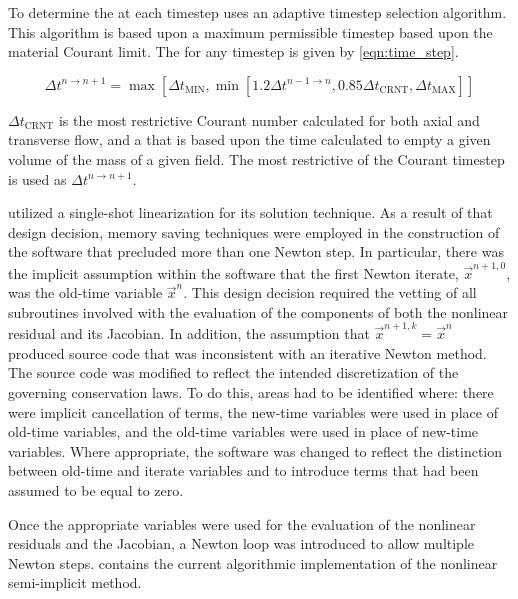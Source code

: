 To determine the \dt{} at each timestep \cobra{} uses an adaptive timestep selection algorithm.
This algorithm is based upon a maximum permissible timestep based upon the material Courant limit.
The \dt{} for any timestep is given by \eqref{eqn:time_step}.

\begin{equation}
\label{eqn:time_step}
\Delta t^{n \rightarrow n+1} = \max\left[ \Delta t_{\text{MIN}}, \min\left[1.2 \Delta t^{n-1 \rightarrow n}, 0.85 \Delta t_{\text{CRNT}}, \Delta t_{\text{MAX}} \right]\right]
\end{equation}

$\Delta t_{\text{CRNT}}$ is the most restrictive Courant number calculated for both axial and transverse flow, and a \dt{} that is based upon the time calculated to empty a given volume of the mass of a given field.
The most restrictive of the Courant timestep is used as $\Delta t^{n \rightarrow n+1}$.

\cobra{} utilized a single-shot linearization for its solution technique.
As a result of that design decision, memory saving techniques were employed in the construction of the software that precluded more than one Newton step.
In particular, there was the implicit assumption within the software that the first Newton iterate, $\vec{x}^{n+1, 0}$, was the old-time variable $\vec{x}^{n}$.
This design decision required the vetting of all subroutines involved with the evaluation of the components of both the nonlinear residual and its Jacobian.
In addition, the assumption that $\vec{x}^{n+1, k} = \vec{x}^{n}$ produced source code that was inconsistent with an iterative Newton method.
The source code was modified to reflect the intended discretization of the governing conservation laws.
To do this, areas had to be identified where: there were implicit cancellation of terms, the new-time variables were used in place of old-time variables, and the old-time variables were used in place of new-time variables.
Where appropriate, the software was changed to reflect the distinction between old-time and iterate variables and to introduce terms that had been assumed to be equal to zero.

Once the appropriate variables were used for the evaluation of the nonlinear residuals and the Jacobian, a Newton loop was introduced to allow multiple Newton steps.
 contains the current algorithmic implementation of the nonlinear semi-implicit method.

